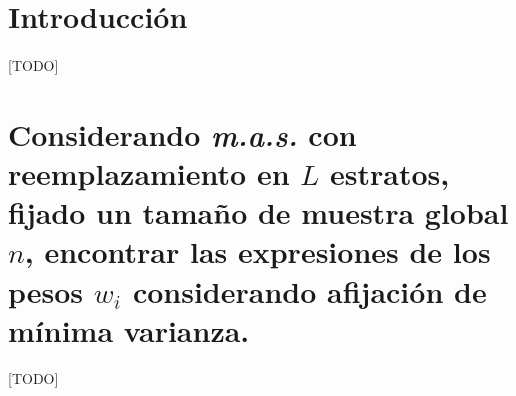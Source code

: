 \documentclass{article}
\begin{document}
  \maketitle


  \section{Introducción}

    \paragraph{}
    [TODO]

  \section{Considerando \emph{m.a.s.} con reemplazamiento en $L$ estratos, fijado un tamaño de muestra global $n$, encontrar las expresiones de los pesos $w_i$ considerando afijación de mínima varianza.}

    \paragraph{}
    [TODO]


  \nocite{muest2017}
  \nocite{sarndal2003model}

  
  
\end{document}
